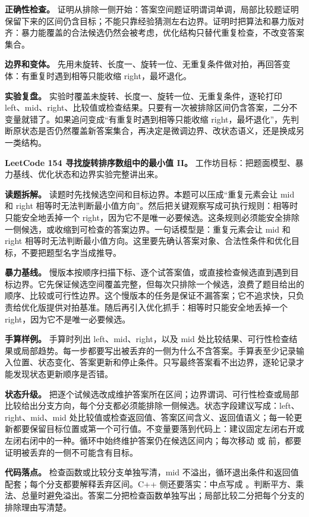 \textbf{正确性检查。} 证明从排除一侧开始：答案空间题证明谓词单调，局部比较题证明保留下来的区间仍含目标；不能只靠经验猜测左右边界。证明时把算法和暴力版对齐：暴力能覆盖的合法候选仍然会被考虑，优化结构只替代重复检查，不改变答案集合。

\textbf{边界和变体。} 先用未旋转、长度一、旋转一位、无重复条件做对拍，再回答变体：有重复时遇到相等只能收缩 right，最坏退化。

\textbf{实验复盘。} 实验时覆盖未旋转、长度一、旋转一位、无重复条件，逐轮打印 left、mid、right、比较值或检查结果。只要有一次被排除区间仍含答案，二分不变量就错了。如果追问变成“有重复时遇到相等只能收缩 right，最坏退化”，先判断原状态是否仍然覆盖新答案集合，再决定是微调边界、改状态语义，还是换成另一类结构。

\noindent\textbf{LeetCode 154 寻找旋转排序数组中的最小值 II。} 工作坊目标：把题面模型、暴力基线、优化状态和边界实验完整讲出来。

\textbf{读题拆解。} 读题时先找候选空间和目标边界。本题可以压成“重复元素会让 mid 和 right 相等时无法判断最小值方向”。然后把关键观察写成可执行规则：相等时只能安全地丢掉一个 right，因为它不是唯一必要候选。这条规则必须能安全排除一侧候选，或收缩到可检查的答案边界。一句话模型是：重复元素会让 mid 和 right 相等时无法判断最小值方向。这里要先确认答案对象、合法性条件和优化目标，不要把题型名字当成推导。

\textbf{暴力基线。} 慢版本按顺序扫描下标、逐个试答案值，或直接检查候选直到遇到目标边界。它先保证候选空间覆盖完整，但每次只排除一个候选，浪费了题目给出的顺序、比较或可行性边界。这个慢版本的任务是保证不漏答案；它不追求快，只负责给优化版提供对拍基准。随后再引入优化抓手：相等时只能安全地丢掉一个 right，因为它不是唯一必要候选。

\textbf{手算样例。} 手算时列出 left、mid、right，以及 mid 处比较结果、可行性检查结果或局部趋势。每一步都要写出被丢弃的一侧为什么不含答案。手算表至少记录输入位置、状态变化、答案更新和停止条件。只写最终答案看不出边界，逐轮记录才能发现状态更新顺序是否错。

\textbf{状态升级。} 把逐个试候选改成维护答案所在区间；边界谓词、可行性检查或局部比较给出分支方向，每个分支都必须能排除一侧候选。状态字段建议写成：left、right、mid、mid 处比较值或检查返回值、答案区间含义、返回值语义；每一轮更新都要保留目标位置或第一个可行值。不变量要落到代码上：建议固定左闭右开或左闭右闭中的一种。循环中始终维护答案仍在候选区间内；每次移动  或  前，都要证明被丢弃的一侧不可能含有目标。

\textbf{代码落点。} 检查函数或比较分支单独写清，mid 不溢出，循环退出条件和返回值配套；每个分支都要解释丢弃区间。C++ 侧还要落实：中点写成 。判断平方、乘法、总量时避免溢出。答案二分把检查函数单独写出；局部比较二分把每个分支的排除理由写清楚。

